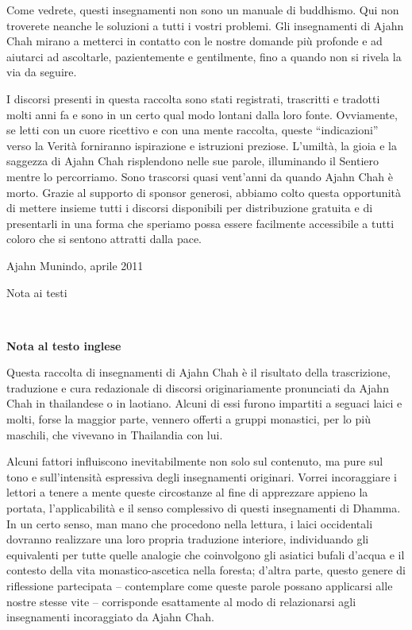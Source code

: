 Come vedrete, questi insegnamenti non sono un manuale di buddhismo. Qui
non troverete neanche le soluzioni a tutti i vostri problemi. Gli
insegnamenti di Ajahn Chah mirano a metterci in contatto con le nostre
domande più profonde e ad aiutarci ad ascoltarle, pazientemente e
gentilmente, fino a quando non si rivela la via da seguire.

I discorsi presenti in questa raccolta sono stati registrati, trascritti
e tradotti molti anni fa e sono in un certo qual modo lontani dalla loro
fonte. Ovviamente, se letti con un cuore ricettivo e con una mente
raccolta, queste ``indicazioni'' verso la Verità forniranno ispirazione
e istruzioni preziose. L'umiltà, la gioia e la saggezza di Ajahn Chah
risplendono nelle sue parole, illuminando il Sentiero mentre lo
percorriamo. Sono trascorsi quasi vent'anni da quando Ajahn Chah è
morto. Grazie al supporto di sponsor generosi, abbiamo colto questa
opportunità di mettere insieme tutti i discorsi disponibili per
distribuzione gratuita e di presentarli in una forma che speriamo possa
essere facilmente accessibile a tutti coloro che si sentono attratti
dalla pace.

Ajahn Munindo, aprile 2011

Nota ai testi



\textbf{Nota al testo inglese}

Questa raccolta di insegnamenti di Ajahn Chah è il risultato della
trascrizione, traduzione e cura redazionale di discorsi originariamente
pronunciati da Ajahn Chah in thailandese o in laotiano. Alcuni di essi
furono impartiti a seguaci laici e molti, forse la maggior parte,
vennero offerti a gruppi monastici, per lo più maschili, che vivevano in
Thailandia con lui.

Alcuni fattori influiscono inevitabilmente non solo sul contenuto, ma
pure sul tono e sull'intensità espressiva degli insegnamenti originari.
Vorrei incoraggiare i lettori a tenere a mente queste circostanze al
fine di apprezzare appieno la portata, l'applicabilità e il senso
complessivo di questi insegnamenti di Dhamma. In un certo senso, man
mano che procedono nella lettura, i laici occidentali dovranno
realizzare una loro propria traduzione interiore, individuando gli
equivalenti per tutte quelle analogie che coinvolgono gli asiatici
bufali d'acqua e il contesto della vita monastico-ascetica nella
foresta; d'altra parte, questo genere di riflessione partecipata --
contemplare come queste parole possano applicarsi alle nostre stesse
vite -- corrisponde esattamente al modo di relazionarsi agli
insegnamenti incoraggiato da Ajahn Chah.

